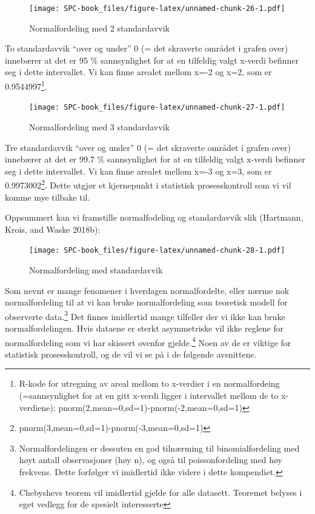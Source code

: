 \documentclass[
]{book}
\begin{document}
\begin{figure}
\centering
\texttt{[image: SPC-book\_files/figure-latex/unnamed-chunk-26-1.pdf]}
\caption{\label{fig:unnamed-chunk-26}Normalfordeling med 2 standardavvik}
\end{figure}

To standardavvik ``over og under'' 0 (= det skraverte området i grafen over) innebærer at det er 95 \% sannsynlighet for at en tilfeldig valgt x-verdi befinner seg i dette intervallet. Vi kan finne arealet mellom x=-2 og x=2, som er 0.9544997\footnote{R-kode for utregning av areal mellom to x-verdier i en normalfordeing (=sannsynlighet for at en gitt x-verdi ligger i intervallet mellom de to x-verdiene): pnorm(2,mean=0,sd=1)-pnorm(-2,mean=0,sd=1)}.

\begin{figure}
\centering
\texttt{[image: SPC-book\_files/figure-latex/unnamed-chunk-27-1.pdf]}
\caption{\label{fig:unnamed-chunk-27}Normalfordeling med 3 standardavvik}
\end{figure}

Tre standardavvik ``over og under'' 0 (= det skraverte området i grafen over) innebærer at det er 99.7 \% sannsynlighet for at en tilfeldig valgt x-verdi befinner seg i dette intervallet. Vi kan finne arealet mellom x=-3 og x=3, som er 0.9973002\footnote{pnorm(3,mean=0,sd=1)-pnorm(-3,mean=0,sd=1)}. Dette utgjør et kjernepunkt i statistisk prosesskontroll som vi vil komme mye tilbake til.

Oppsummert kan vi framstille normalfodeling og standardavvik slik (Hartmann, Krois, and Waske 2018b):

\begin{figure}
\centering
\texttt{[image: SPC-book\_files/figure-latex/unnamed-chunk-28-1.pdf]}
\caption{\label{fig:unnamed-chunk-28}Normalfordeling med standardavvik}
\end{figure}

Som nevnt er mange fenomener i hverdagen normalfordelte, eller nærme nok normalfordeling til at vi kan bruke normalfordeling som teoretisk modell for observerte data.\footnote{Normalfordelingen er dessuten en god tilnærming til binomialfordeling med høyt antall observasjoner (høy n), og også til poissonfordeling med høy frekvens. Dette forfølger vi imidlertid ikke videre i dette kompendiet.} Det finnes imidlertid mange tilfeller der vi ikke kan bruke normalfordelingen. Hvis dataene er sterkt asymmetriske vil ikke reglene for normalfordeling som vi har skissert ovenfor gjelde.\footnote{Chebyshevs teorem vil imidlertid gjelde for alle datasett. Teoremet belyses i eget vedlegg for de spesielt interesserte} Noen av de er viktige for statistisk prosesskontroll, og de vil vi se på i de følgende avsnittene.
\end{document}
